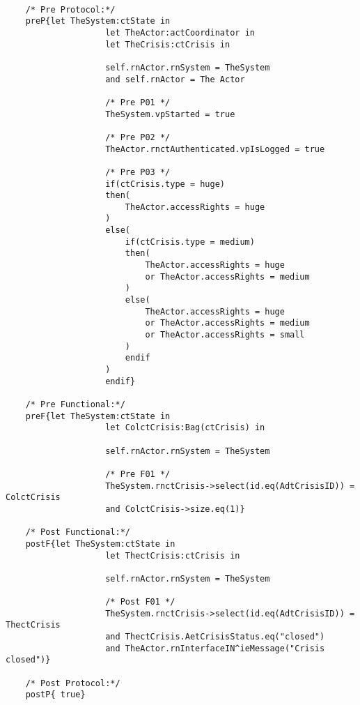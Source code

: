 	\scriptsize
	\vspace{0.5cm}
	\begin{lstlisting}[style=MessirStyle,firstnumber=auto,captionpos=b,caption={\msrmessir (MCL-oriented) specification of the operation \emph{oeCloseCrisis}.},label=OM-actCoordinator-oeCloseCrisis-MCL-LST]

	/* Pre Protocol:*/ 
	preP{let TheSystem:ctState in
					let TheActor:actCoordinator in
					let TheCrisis:ctCrisis in
					
					self.rnActor.rnSystem = TheSystem
					and self.rnActor = The Actor
					
					/* Pre P01 */
					TheSystem.vpStarted = true
					
					/* Pre P02 */
					TheActor.rnctAuthenticated.vpIsLogged = true
					
					/* Pre P03 */
					if(ctCrisis.type = huge)
					then(
						TheActor.accessRights = huge
					)
					else(
						if(ctCrisis.type = medium)
						then(
							TheActor.accessRights = huge
							or TheActor.accessRights = medium
						)
						else(
							TheActor.accessRights = huge
							or TheActor.accessRights = medium
							or TheActor.accessRights = small
						)
						endif
					)
					endif}
	
	/* Pre Functional:*/
	preF{let TheSystem:ctState in
					let ColctCrisis:Bag(ctCrisis) in
				
					self.rnActor.rnSystem = TheSystem
				
					/* Pre F01 */
					TheSystem.rnctCrisis->select(id.eq(AdtCrisisID)) = ColctCrisis
					and ColctCrisis->size.eq(1)}
	
	/* Post Functional:*/ 
	postF{let TheSystem:ctState in
					let ThectCrisis:ctCrisis in
				
					self.rnActor.rnSystem = TheSystem
				
					/* Post F01 */
					TheSystem.rnctCrisis->select(id.eq(AdtCrisisID)) = ThectCrisis
					and ThectCrisis.AetCrisisStatus.eq("closed")
					and TheActor.rnInterfaceIN^ieMessage("Crisis closed")}
	
	/* Post Protocol:*/ 
	postP{ true}
	
	\end{lstlisting}
	\normalsize 
	
	
	
	





